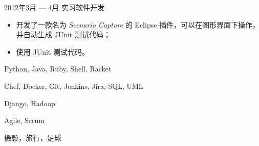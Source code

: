 \documentclass{newresume}
\begin{document}
\begin{body}
	{2012年3月 --- 4月}
	{实习软件开发}{}
	\begin{itemize}[noitemsep,topsep=0pt]
		\item 开发了一款名为 \textit{Scenario Capture} 的 Eclipse 插件，可以在图形界面下操作，并自动生成 JUnit 测试代码；
		\item 使用 JUnit 测试代码。
	\end{itemize}
\end{body}
\smallskip


\begin{description}[style=nextline,leftmargin=3em,topsep=1pt]
	\item[语言] Python, Java, Ruby, Shell, Racket
	\item[工具] Chef, Docker, Git, Jenkins, Jira, SQL, UML
	\item[框架] Django, Hadoop
	\item[方法] Agile, Scrum
\end{description}





%




\begin{body}
	摄影，旅行，足球
\end{body}
\end{document}
